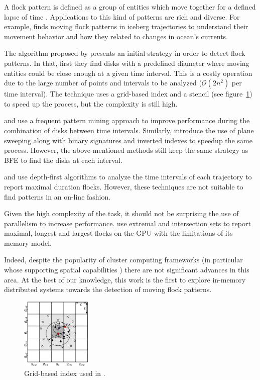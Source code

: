 \documentclass[12pt]{scrartcl}
\begin{document}
A flock pattern is defined as a group of entities which move together for a defined lapse of time \citep{benkert_reporting_2008}.  Applications to this kind of patterns are rich and diverse.  For example, \citep{calderon_romero_mining_2011} finds moving flock patterns in iceberg trajectories to understand their movement behavior and how they related to changes in ocean's currents. 
 
The algorithm proposed by \citep{vieira_-line_2009} presents an initial strategy in order to detect flock patterns.  In that, first they find disks with a predefined diameter where moving entities could be close enough at a given time interval.  This is a costly operation due to the large number of points and intervals to be analyzed ($\mathcal{O}(2n^2)$ per time interval).  The technique uses a grid-based index and a stencil (see figure~\ref{fig:grid}) to speed up the process, but the complexity is still high.

\cite{calderon_romero_mining_2011} and \cite{turdukulov_visual_2014} use a frequent pattern mining approach to improve performance during the combination of disks between time intervals.  Similarly, \cite{tanaka_improved_2016} introduce the use of plane sweeping along with binary signatures and inverted indexes to speedup the same process.  However, the above-mentioned methods still keep the same strategy as BFE to find the disks at each interval.  

\citep{arimura_finding_2014} and \citep{geng_enumeration_2014} use depth-first algorithms to analyze the time intervals of each trajectory to report maximal duration flocks.  However, these techniques are not suitable to find patterns in an on-line fashion.

Given the high complexity of the task, it should not be surprising the use of parallelism to increase performance.  \cite{fort_parallel_2014} use extremal and intersection sets to report maximal, longest and largest flocks on the GPU with the limitations of its memory model.  

Indeed, despite the popularity of cluster computing frameworks (in particular whose supporting spatial capabilities \citep{eldawy_spatialhadoop:_2014, yu_demonstration_2016, pellechia_geomesa:_2015, xie_simba:_2016}) there are not significant advances in this area.  At the best of our knowledge, this work is the first to explore in-memory distributed systems towards the detection of moving flock patterns.

\begin{figure}
 \centering
 \includegraphics[width=0.3\textwidth]{./figures/grid.png}
 \caption{Grid-based index used in \cite{vieira_-line_2009}.}
 \label{fig:grid}
\end{figure}
\end{document}
